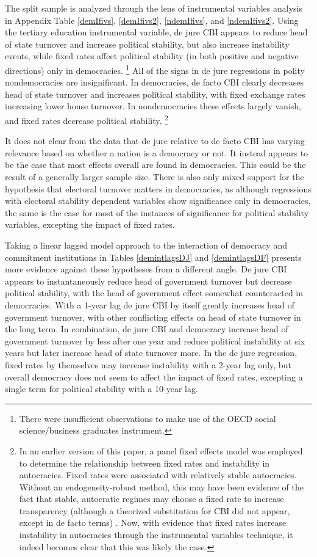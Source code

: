 \documentclass{article}
\begin{document}
    The split sample is analyzed through the lens of instrumental variables analysis in Appendix Table \ref*{demIfivs}, \ref*{demIfivs2}, \ref{ndemIfivs}, and \ref*{ndemIfivs2}. Using the tertiary education instrumental variable, de jure CBI appears to reduce head of state turnover and increase political stability, but also increase instability events, while fixed rates affect political stability (in both positive and negative directions) only in democracies. \footnote{There were insufficient observations to make use of the OECD social science/business graduates instrument.} All of the signs in de jure regressions in polity nondemocracies are insignificant. In democracies, de facto CBI clearly decreases head of state turnover and increases political stability, with fixed exchange rates increasing lower house turnover. In nondemocracies these effects largely vanish, and fixed rates decrease political stability. \footnote{In an earlier version of this paper, a panel fixed effects model was employed to determine the relationship between fixed rates and instability in autocracies. Fixed rates were associated with relatively stable autocracies. Without an endogeneity-robust method, this may have been evidence of the fact that stable, autocratic regimes may choose a fixed rate to increase transparency (although a theorized substitution for CBI did not appear, except in de facto terms) \citep{broz_political_2002}. Now, with evidence that fixed rates increase instability in autocracies through the instrumental variables technique, it indeed becomes clear that this was likely the case.}

    It does not clear from the data that de jure relative to de facto CBI has varying relevance based on whether a nation is a democracy or not. It instead appears to be the case that most effects overall are found in democracies. This could be the result of a generally larger sample size. There is also only mixed support for the hypothesis that electoral turnover matters in democracies, as although regressions with electoral stability dependent variables show significance only in democracies, the same is the case for most of the instances of significance for political stability variables, excepting the impact of fixed rates.

    Taking a linear lagged model approach to the interaction of democracy and commitment institutions in Tables \ref*{demintlagsDJ} and \ref*{demintlagsDF} presents more evidence against these hypotheses from a different angle. De jure CBI appears to instantaneously reduce head of government turnover but decrease political stability, with the head of government effect somewhat counteracted in democracies. With a 1-year lag de jure CBI by itself greatly increases head of government turnover, with other conflicting effects on head of state turnover in the long term. In combination, de jure CBI and democracy increase head of government turnover by less after one year and reduce political instability at six years but later increase head of state turnover more. In the de jure regression, fixed rates by themselves may increase instability with a 2-year lag only, but overall democracy does not seem to affect the impact of fixed rates, excepting a single term for political stability with a 10-year lag.
\end{document}
